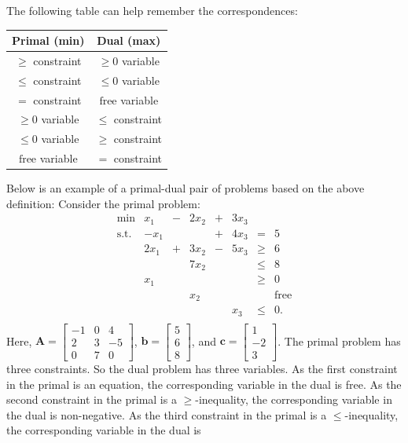 The following table can help remember the correspondences:
\begin{longtable}[]{@{}cc@{}}
\toprule
Primal (min) & Dual (max)\tabularnewline
\midrule
\endhead
\(\geq\) constraint & \(\geq 0\) variable\tabularnewline
\(\leq\) constraint & \(\leq 0\) variable\tabularnewline
\(=\) constraint & \(\text{free}\) variable\tabularnewline
\(\geq 0\) variable & \(\leq\) constraint\tabularnewline
\(\leq 0\) variable & \(\geq\) constraint\tabularnewline
\(\text{free}\) variable & \(=\) constraint\tabularnewline
\bottomrule
\end{longtable}
Below is an example of a primal-dual pair of problems based on the above
definition: Consider the primal problem: \[\begin{array}{rrcrcrcl}
\mbox{min} &  x_1 & - & 2x_2 & + & 3x_3 & \\
\mbox{s.t.} & -x_1 &   &      & + & 4x_3 &  =   &5 \\
            & 2x_1 & + & 3x_2 & - & 5x_3 & \geq &  6 \\
            &      &   & 7x_2 &   &      & \leq &  8 \\
            &  x_1 &   &      &   &      & \geq &  0 \\
            &     &    & x_2  &   &      & &      \mbox{free} \\
            &     &    &      &   & x_3  & \leq & 0.\\
\end{array}\]
Here,
\(\mathbf{A}= \begin{bmatrix}  -1 & 0 & 4 \\  2 & 3 & -5 \\  0 & 7 & 0 \end{bmatrix}\),
\(\mathbf{b} = \begin{bmatrix}5 \\6\\8\end{bmatrix}\), and
\(\mathbf{c} = \begin{bmatrix}1 \\-2\\3\end{bmatrix}\).
\newpage\noindent 
The primal problem has three constraints. So the dual problem has three
variables. As the first constraint in the primal is an equation, the
corresponding variable in the dual is free. As the second constraint in
the primal is a \(\geq\)-inequality, the corresponding variable in the
dual is non-negative. As the third constraint in the primal is a
\(\leq\)-inequality, the corresponding variable in the dual is
